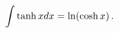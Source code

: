 \[\int\mathop{\tanh\/}\nolimits xdx=\mathop{\ln\/}\nolimits\!\left(\mathop{\cosh%
\/}\nolimits x\right).\]